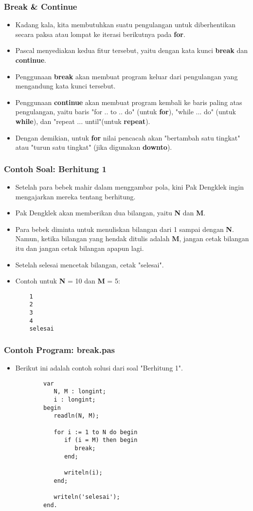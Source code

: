 \documentclass{beamer}
\begin{document}
\begin{frame}
\frametitle{Break \& Continue}
\begin{itemize}
	\item Kadang kala, kita membutuhkan suatu pengulangan untuk diberhentikan secara paksa atau lompat ke iterasi berikutnya pada \textbf{for}.
	\item Pascal menyediakan kedua fitur tersebut, yaitu dengan kata kunci \alert{\textbf{break}} dan \alert{\textbf{continue}}.
	\item Penggunaan \textbf{break} akan membuat program keluar dari pengulangan yang mengandung kata kunci tersebut.
	\item Penggunaan \textbf{continue} akan membuat program kembali ke baris paling atas pengulangan, yaitu baris "for .. to .. do" (untuk \textbf{for}), "while ... do" (untuk \textbf{while}), dan "repeat ... until"(untuk \textbf{repeat}).
	\item Dengan demikian, untuk \textbf{for} nilai pencacah akan "bertambah satu tingkat" atau "turun satu tingkat" (jika digunakan \textbf{downto}).
\end{itemize}
\end{frame}

\begin{frame}[fragile]
\frametitle{Contoh Soal: Berhitung 1}
\begin{itemize}
	\item Setelah para bebek mahir dalam menggambar pola, kini Pak Dengklek ingin mengajarkan mereka tentang berhitung.
	\item Pak Dengklek akan memberikan dua bilangan, yaitu \textbf{N} dan \textbf{M}.
	\item Para bebek diminta untuk menuliskan bilangan dari 1 sampai dengan \textbf{N}. Namun, ketika bilangan yang hendak ditulis adalah \textbf{M}, jangan cetak bilangan itu dan jangan cetak bilangan apapun lagi.
	\item Setelah selesai mencetak bilangan, cetak "selesai".
	\item Contoh untuk \textbf{N} = 10 dan \textbf{M} = 5:
	\begin{lstlisting}
	1
	2
	3
	4
	selesai
	\end{lstlisting}
\end{itemize}
\end{frame}

\begin{frame}[fragile]
\frametitle{Contoh Program: break.pas}
\begin{itemize}
	\item Berikut ini adalah contoh solusi dari soal "Berhitung 1".
	\begin{lstlisting}
		var
		   N, M : longint;
		   i : longint;
		begin
		   readln(N, M);
		
		   for i := 1 to N do begin
		      if (i = M) then begin
		         break;
		      end;
		
		      writeln(i);
		   end;
		   
		   writeln('selesai');
		end.
	\end{lstlisting}
\end{itemize}
\end{frame}
\end{document}

